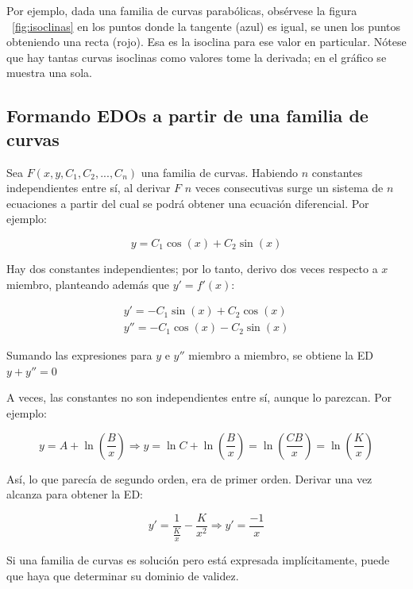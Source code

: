 \documentclass{article}
\begin{document}
Por ejemplo, dada una familia de curvas parabólicas, obsérvese la figura ~\ref{fig:isoclinas} en los puntos donde la tangente (azul) es igual, se unen los puntos obteniendo una recta (rojo). Esa es la isoclina para ese valor en particular. Nótese que hay tantas curvas isoclinas como valores tome la derivada; en el gráfico se muestra una sola.

\subsection{Formando EDOs a partir de una familia de curvas}

Sea $F(x, y, C_1, C_2, ..., C_n)$ una familia de curvas. Habiendo $n$ constantes independientes entre sí, al derivar $F$ $n$ veces consecutivas surge un sistema de $n$ ecuaciones a partir del cual se podrá obtener una ecuación diferencial. Por ejemplo:

\begin{equation}
y = C_1 \cos(x) + C_2 \sin(x)
\end{equation}

Hay dos constantes independientes; por lo tanto, derivo dos veces respecto a $x$ miembro, planteando además que $y' = f'(x)$:

\begin{subequations}
\begin{align}
y' = -C_1 \sin(x) + C_2 \cos(x) \\
y'' = -C_1 \cos(x) - C_2 \sin(x)
\end{align}
\end{subequations}

Sumando las expresiones para $y$ e $y''$ miembro a miembro, se obtiene la ED $y + y'' = 0$

A veces, las constantes no son independientes entre sí, aunque lo parezcan. Por ejemplo:

\begin{equation}
y = A + \ln \left( \frac{B}{x} \right) \Rightarrow y = \ln C + \ln \left( \frac{B}{x} \right) = \ln \left( \frac{C B}{x} \right) = \ln \left( \frac{K}{x} \right)
\end{equation}

Así, lo que parecía de segundo orden, era de primer orden. Derivar una vez alcanza para obtener la ED:

\begin{equation}
y' = \frac{1}{\frac{K}{x}} -\frac{K}{x^2} \Rightarrow y' = \frac{-1}{x}
\end{equation}

Si una familia de curvas es solución pero está expresada implícitamente, puede que haya que determinar su dominio de validez.
\end{document}
